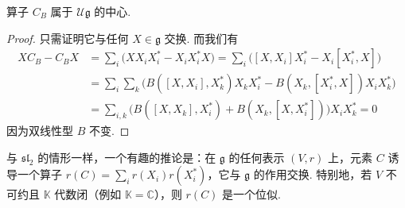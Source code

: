 \begin{proposition*}
算子 $C_B$ 属于 $\mathcal U\mathfrak g$ 的中心.
\end{proposition*}

\begin{proof}
只需证明它与任何 $X\in\mathfrak g$ 交换. 而我们有
\begin{align*}
XC_B-C_BX
&=\sum_i\bigl(XX_iX_i^{*}-X_iX_i^{*}X\bigr)
=\sum_i\bigl([X,X_i]X_i^{*}-X_i[X_i^{*},X]\bigr)\\
&=\sum_i\sum_k\bigl(B([X,X_i],X_k^{*})X_kX_i^{*}-B(X_k,[X_i^{*},X])X_iX_k^{*}\bigr)\\
&=\sum_{i,k}\bigl(B([X,X_k],X_i^{*})+B(X_k,[X,X_i^{*}])\bigr)X_iX_k^{*}=0
\end{align*}
因为双线性型 $B$ 不变.
\end{proof}

与 $\mathfrak{sl}_2$ 的情形一样，一个有趣的推论是：在 $\mathfrak g$ 的任何表示 $(V,r)$ 上，元素 $C$ 诱导一个算子 $r(C)=\sum_i r(X_i)r(X_i^{*})$，它与 $\mathfrak g$ 的作用交换. 特别地，若 $V$ 不可约且 $\mathbb K$ 代数闭（例如 $\mathbb K=\mathbb C$），则 $r(C)$ 是一个位似.
